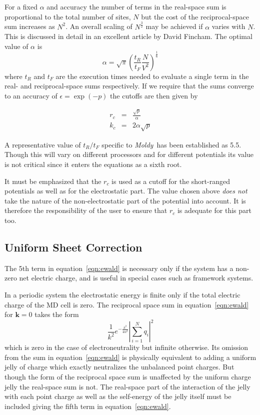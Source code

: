 \documentclass[a4paper,twoside]{report}
\providecommand{\bm}[1]{\mathbf{#1}}
\newcommand{\moldy}{\emph{Moldy}}
\begin{document}
For a fixed $\alpha$ and accuracy the number of terms in the
real-space sum is proportional to the total number of sites, $N$ but
the cost of the reciprocal-space sum increases as $N^2$. An overall
scaling of $N^\frac{3}{2}$ may be achieved if $\alpha$ varies with
$N$. This is discussed in detail in an excellent article by David
Fincham\cite{fincham:94}.  The optimal value of $\alpha$ is
%
\begin{equation}
\alpha = \sqrt{\pi} \left ( \frac{t_R}{t_F} \frac{N}{V^2}\right )
^\frac{1}{6} 
\label{eqn:ewald-alpha}
\end{equation}
%
where $t_R$ and $t_F$ are the execution times needed to evaluate a
single term in the real- and reciprocal-space sums respectively.
If we require that the sums converge to an accuracy of $ \epsilon =
\exp ( -p )$ the cutoffs are then given by

\begin{eqnarray}
r_c  &=& \frac{\sqrt{p}}{\alpha} \\
k_c &=& 2 \alpha \sqrt{p}
\label{eqn:ewald-cut}
\end{eqnarray}

A representative value of $t_R/t_F$ specific to \moldy\ has been
established as 5.5.  Though this will vary on different processors
and for different potentials its value is not critical since it
enters the equations as a sixth root.  

It must be emphasized that the $r_c$ is used as a cutoff for the
short-ranged potentials as well as for the electrostatic part.  The
value chosen above \emph{does not} take the nature of the
non-electrostatic part of the potential into account.  It is therefore
the responsibility of the user to ensure that $r_c$ is adequate for
this part too.

\subsection{Uniform Sheet Correction}
The 5th term in equation~\ref{eqn:ewald} is necessary only if the system
has a non-zero net electric charge, and is useful in special cases such
as framework systems.  

In a periodic system the electrostatic energy is finite only if the
total electric charge of the MD cell is zero.  The reciprocal space
sum in equation~\ref{eqn:ewald} for $\bm{k}=0$ takes the form
\[\frac{1}{k^2}e^{-\frac{k^2}{4 \alpha^2}} \left | \sum_{i=1}^{N} q_i
 \right |^2\] which is zero in the case of electroneutrality but
infinite otherwise.  Its omission from the sum in
equation~\ref{eqn:ewald} is physically equivalent to adding a uniform
jelly of charge which exactly neutralizes the unbalanced point
charges.  But though the form of the reciprocal space sum is
unaffected by the uniform charge jelly the real-space sum is not.  The
real-space part of the interaction of the jelly with each point charge
as well as the self-energy of the jelly itself must be included giving
the fifth term in equation~\ref{eqn:ewald}.
\end{document}
